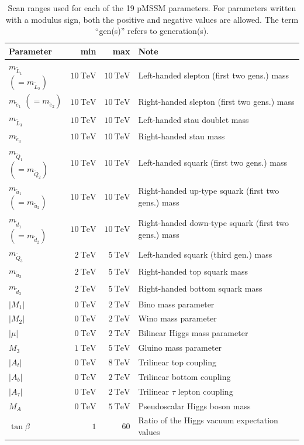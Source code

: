 \begin{table}[h]
	\centering
	\small
	\caption{Scan ranges used for each of the 19 pMSSM parameters. For parameters written with a modulus sign, both the positive and negative values are allowed. The term ``gen(s)'' refers to generation(s).}
	\setlength\heavyrulewidth{0.2ex}
	\begin{tabular} {l r r l}
		\toprule
		Parameter & min & max & Note \\ 
		\midrule
		$m_{\tilde{L}_1}$ $(=m_{\tilde{L}_2})$ & $\SI{10}{\TeV}$ & $\SI{10}{\TeV}$ & Left-handed slepton (first two gens.) mass \\
		$m_{\tilde{e}_1}$ $(=m_{\tilde{e}_2})$ & $\SI{10}{\TeV}$ & $\SI{10}{\TeV}$ & Right-handed slepton (first two gens.) mass \\ 
		$m_{\tilde{L}_3}$ & $\SI{10}{\TeV}$ & $\SI{10}{\TeV}$ & Left-handed stau doublet mass \\
		$m_{\tilde{e}_3}$ & $\SI{10}{\TeV}$ & $\SI{10}{\TeV}$ & Right-handed stau mass \\
		\midrule
		$m_{\tilde{Q}_1}$ $(=m_{\tilde{Q}_2})$ & $\SI{10}{\TeV}$ & $\SI{10}{\TeV}$ & Left-handed squark (first two gens.) mass \\
		$m_{\tilde{u}_1}$ $(=m_{\tilde{u}_2})$ & $\SI{10}{\TeV}$ & $\SI{10}{\TeV}$ & Right-handed up-type squark (first two gens.) mass \\
		$m_{\tilde{d}_1}$ $(=m_{\tilde{d}_2})$ &$\SI{10}{\TeV}$ & $\SI{10}{\TeV}$ & Right-handed down-type squark (first two gens.) mass \\
		$m_{\tilde{Q}_3}$ & $\SI{2}{\TeV}$ & $\SI{5}{\TeV}$ & Left-handed squark (third gen.) mass \\
		$m_{\tilde{u}_3}$ & $\SI{2}{\TeV}$ & $\SI{5}{\TeV}$ & Right-handed top squark mass \\
		$m_{\tilde{d}_3}$ & $\SI{2}{\TeV}$ & $\SI{5}{\TeV}$ & Right-handed bottom squark mass \\
		\midrule
		$\vert M_1\vert$ & $\SI{0}{\TeV}$ & $\SI{2}{\TeV}$ & Bino mass parameter \\
		$\vert M_2\vert$ & $\SI{0}{\TeV}$ & $\SI{2}{\TeV}$ & Wino mass parameter \\
		$\vert\mu\vert$ & $\SI{0}{\TeV}$ & $\SI{2}{\TeV}$ & Bilinear Higgs mass parameter \\
		$M_3$ & $\SI{1}{\TeV}$ & $\SI{5}{\TeV}$ & Gluino mass parameter \\
		\midrule
		$\vert A_t\vert$ & $\SI{0}{\TeV}$ & $\SI{8}{\TeV}$ & Trilinear top coupling \\
		$\vert A_b\vert$ & $\SI{0}{\TeV}$ & $\SI{2}{\TeV}$ & Trilinear bottom coupling \\
		$\vert A_\tau\vert$ & $\SI{0}{\TeV}$ & $\SI{2}{\TeV}$ & Trilinear $\tau$ lepton coupling \\
		$M_A$ & $\SI{0}{\TeV}$ & $\SI{5}{\TeV}$ & Pseudoscalar Higgs boson mass \\
		$\tan\beta$ & $1$ & $60$ & Ratio of the Higgs vacuum expectation values \\
		\bottomrule
	\end{tabular}

	\label{fig:pmssm_scan_ranges}   
\end{table}

